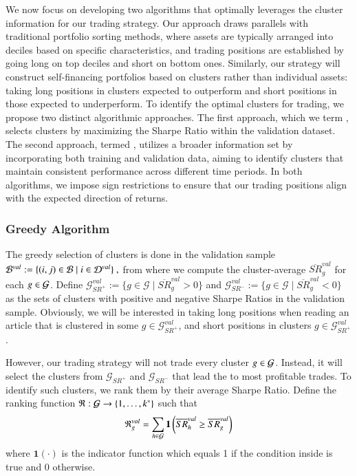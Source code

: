 We now focus on developing two algorithms that optimally leverages the cluster information for our trading strategy. Our approach draws parallels with traditional portfolio sorting methods, where assets are typically arranged into deciles based on specific characteristics, and trading positions are established by going long on top deciles and short on bottom ones. Similarly, our strategy will construct self-financing portfolios based on clusters rather than individual assets: taking long positions in clusters expected to outperform and short positions in those expected to underperform.
%
To identify the optimal clusters for trading, we propose two distinct algorithmic approaches. The first approach, which we term , selects clusters by maximizing the Sharpe Ratio within the validation dataset. The second approach, termed , utilizes a broader information set by incorporating both training and validation data, aiming to identify clusters that maintain consistent performance across different time periods. In both algorithms, we impose sign restrictions to ensure that our trading positions align with the expected direction of returns.

\subsubsection{Greedy Algorithm}

The greedy selection of clusters is done in the validation sample 
$
\mathcal{B}^{val}:= \{
(i,j)\in\mathcal{B} 
 \mid 
  i \in \mathcal{D}^{val} \}
~,
$
from where we compute the cluster-average $\overline{S R}_g^{val}$ for each $g\in\mathcal{G}$.
%
Define $\mathcal G_{SR^+}^{val}:=\{ g\in \mathcal G \mid \overline{SR}_g^{val} >0\}$ and $\mathcal G_{SR^-}^{val}:=\{ g\in \mathcal G \mid \overline{SR}_g^{val} <0\}$ as the sets of clusters with positive and negative Sharpe Ratios in the validation sample. Obviously, we will be interested in taking long positions when reading an article that is clustered in some $g\in \mathcal G_{SR^+}^{val}$, and short positions in clusters $g\in \mathcal G_{SR^+}^{val}$. 

\mx 
However, our trading strategy will not trade every cluster $g\in\mathcal{G}$. Instead, it will select the clusters from $\mathcal G_{SR^+}$ and $\mathcal G_{SR^-}$ that lead the to most profitable trades. 
To identify such clusters, we rank them by their average Sharpe Ratio. Define the ranking function $\mathfrak{R}: \mathcal{G} \to \left\{1, \ldots, k^*\right\}$ such that
$$
\mathfrak{R}_g^{val}
=
\sum_{h \in \mathcal{G}} 
\mathbf{1}\left(
\overline{S R}_h^{val} \geq \overline{S R}_g^{val} 
\right)
$$
where $\mathbf{1}(\cdot)$ is the indicator function which equals 1 if the condition inside is true and 0 otherwise.

